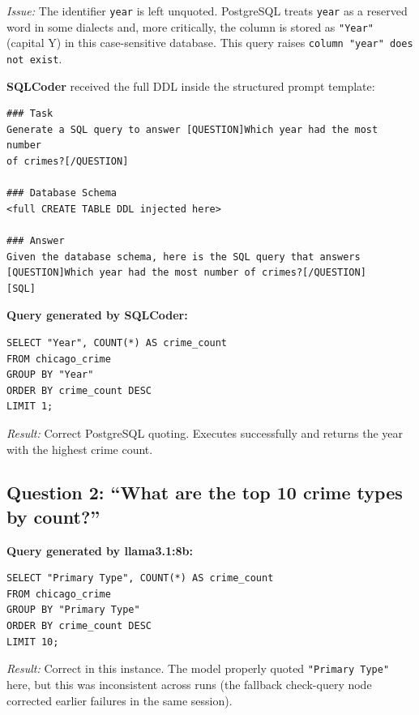 \documentclass[12pt,a4paper]{article}
\begin{document}
\noindent\textit{Issue:} The identifier \texttt{year} is left unquoted.  PostgreSQL
treats \texttt{year} as a reserved word in some dialects and, more critically, the
column is stored as \texttt{"Year"} (capital Y) in this case-sensitive database.
This query raises \texttt{column "year" does not exist}.

\vspace{0.8em}
\noindent\textbf{SQLCoder} received the full DDL inside the structured prompt template:

\begin{lstlisting}[style=prompt, caption={SQLCoder prompt template (abbreviated)}]
### Task
Generate a SQL query to answer [QUESTION]Which year had the most number
of crimes?[/QUESTION]

### Database Schema
<full CREATE TABLE DDL injected here>

### Answer
Given the database schema, here is the SQL query that answers
[QUESTION]Which year had the most number of crimes?[/QUESTION]
[SQL]
\end{lstlisting}

\noindent\textbf{Query generated by SQLCoder:}

\begin{lstlisting}[style=sql, caption={SQLCoder output for Question 1}]
SELECT "Year", COUNT(*) AS crime_count
FROM chicago_crime
GROUP BY "Year"
ORDER BY crime_count DESC
LIMIT 1;
\end{lstlisting}

\noindent\textit{Result:} Correct PostgreSQL quoting.  Executes successfully and
returns the year with the highest crime count.

\vspace{1em}

\subsection{Question 2: ``What are the top 10 crime types by count?''}

\noindent\textbf{Query generated by llama3.1:8b:}

\begin{lstlisting}[style=sql, caption={llama3.1:8b output for Question 2}]
SELECT "Primary Type", COUNT(*) AS crime_count
FROM chicago_crime
GROUP BY "Primary Type"
ORDER BY crime_count DESC
LIMIT 10;
\end{lstlisting}

\noindent\textit{Result:} Correct in this instance.  The model properly quoted
\texttt{"Primary Type"} here, but this was inconsistent across runs (the fallback
check-query node corrected earlier failures in the same session).
\end{document}
